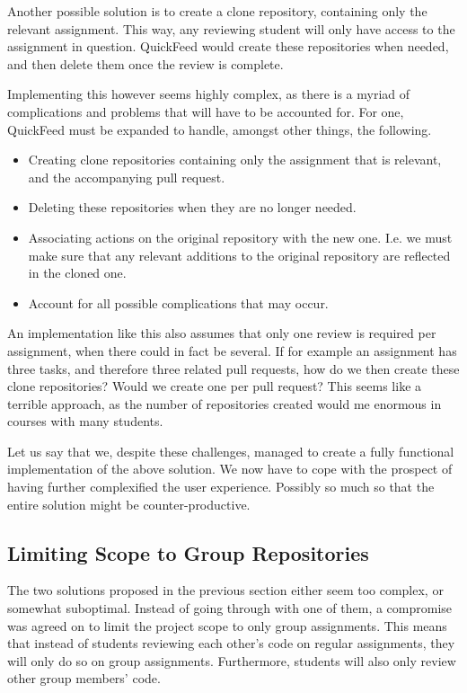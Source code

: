 Another possible solution is to create a clone repository, containing only the relevant assignment. 
This way, any reviewing student will only have access to the assignment in question.
QuickFeed would create these repositories when needed, and then delete them once the review is complete.

Implementing this however seems highly complex, as there is a myriad of complications and problems that will have to be accounted for.
For one, QuickFeed must be expanded to handle, amongst other things, the following.

\begin{itemize}
    \item Creating clone repositories containing only the assignment that is relevant, and the accompanying pull request.
    \item Deleting these repositories when they are no longer needed.
    \item Associating actions on the original repository with the new one.
    I.e. we must make sure that any relevant additions to the original repository are reflected in the cloned one.
    \item Account for all possible complications that may occur.
\end{itemize}

An implementation like this also assumes that only one review is required per assignment, when there could in fact be several.
If for example an assignment has three tasks, and therefore three related pull requests, how do we then create these clone repositories?
Would we create one per pull request?
This seems like a terrible approach, as the number of repositories created would me enormous in courses with many students.

Let us say that we, despite these challenges, managed to create a fully functional implementation of the above solution.
We now have to cope with the prospect of having further complexified the user experience.
Possibly so much so that the entire solution might be counter-productive.

\subsection{Limiting Scope to Group Repositories}

The two solutions proposed in the previous section either seem too complex, or somewhat suboptimal.
Instead of going through with one of them, a compromise was agreed on to limit the project scope to only group assignments.
This means that instead of students reviewing each other's code on regular assignments, they will only do so on group assignments.
Furthermore, students will also only review other group members' code.

